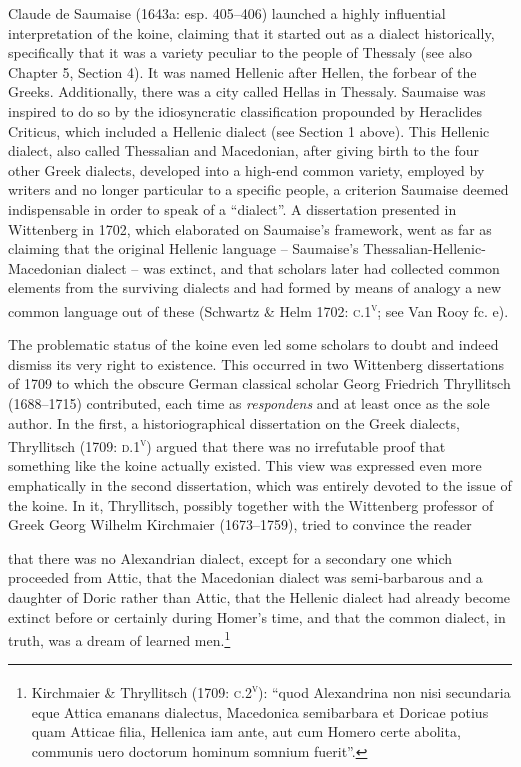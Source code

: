 \documentclass[12pt]{article}
\newenvironment{styleStandard}{\renewcommand\baselinestretch{1.25}\setlength\leftskip{0in}\setlength\rightskip{0in}\setlength\parindent{0.1972in}\setlength\parfillskip{0pt plus 1fil}\setlength\parskip{0in plus 1pt}\writerlistparindent\writerlistleftskip\leavevmode\normalfont\normalsize\writerlistlabel\ignorespaces}{\unskip\vspace{0in plus 1pt}\par}
\newenvironment{styleQuote}{\renewcommand\baselinestretch{1.25}\setlength\leftskip{0.3937in}\setlength\rightskip{0in}\setlength\parindent{0in}\setlength\parfillskip{0pt plus 1fil}\setlength\parskip{0.1665in plus 0.016649999in}\writerlistparindent\writerlistleftskip\leavevmode\normalfont\normalsize\writerlistlabel\ignorespaces}{\unskip\vspace{0.1665in plus 0.016649999in}\par}
\newcommand\writerlistleftskip{}
\newcommand\writerlistparindent{}
\newcommand\writerlistlabel{}
\begin{document}
\begin{styleStandard}
Claude de Saumaise (1643a: esp. 405–406) launched a highly influential interpretation of the koine, claiming that it started out as a dialect historically, specifically that it was a variety peculiar to the people of Thessaly (see also Chapter 5, Section 4). It was named Hellenic after Hellen, the forbear of the Greeks. Additionally, there was a city called Hellas in Thessaly. Saumaise was inspired to do so by the idiosyncratic classification propounded by Heraclides Criticus, which included a Hellenic dialect (see Section 1 above). This Hellenic dialect, also called Thessalian and Macedonian, after giving birth to the four other Greek dialects, developed into a high-end common variety, employed by writers and no longer particular to a specific people, a criterion Saumaise deemed indispensable in order to speak of a “dialect”. A dissertation presented in Wittenberg in 1702, which elaborated on Saumaise’s framework, went as far as claiming that the original Hellenic language – Saumaise’s Thessalian-Hellenic-Macedonian dialect – was extinct, and that scholars later had collected common elements from the surviving dialects and had formed by means of analogy a new common language out of these (Schwartz \& Helm 1702: \textsc{c}.1\textsc{\textsuperscript{v}}; see Van Rooy fc. e)\textsc{.}
\end{styleStandard}

\begin{styleStandard}
The problematic status of the koine even led some scholars to doubt and indeed dismiss its very right to existence. This occurred in two Wittenberg dissertations of 1709 to which the obscure German classical scholar Georg Friedrich Thryllitsch (1688–1715) contributed, each time as \textit{respondens} and at least once as the sole author. In the first, a historiographical dissertation on the Greek dialects, Thryllitsch (1709: \textsc{d.1}\textsc{\textsuperscript{v}}) argued that there was no irrefutable proof that something like the koine actually existed. This view was expressed even more emphatically in the second dissertation, which was entirely devoted to the issue of the koine. In it, Thryllitsch, possibly together with the Wittenberg professor of Greek Georg Wilhelm Kirchmaier (1673–1759), tried to convince the reader
\end{styleStandard}

\begin{styleQuote}
that there was no Alexandrian dialect, except for a secondary one which proceeded from Attic, that the Macedonian dialect was semi-barbarous and a daughter of Doric rather than Attic, that the Hellenic dialect had already become extinct before or certainly during Homer’s time, and that the common dialect, in truth, was a dream of learned men.\footnote{ Kirchmaier \& Thryllitsch (1709: \textsc{c.2}\textsc{\textsuperscript{v}}): “quod Alexandrina non nisi secundaria eque Attica emanans dialectus, Macedonica semibarbara et Doricae potius quam Atticae filia, Hellenica iam ante, aut cum Homero certe abolita, communis uero doctorum hominum somnium fuerit”.}
\end{styleQuote}
\end{document}
